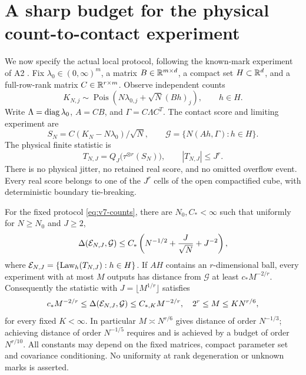 \section{A sharp budget for the physical count-to-contact experiment}
\label{sec:v7-a2}
We now specify the actual local protocol, following the known-mark
experiment of A2 \cite{QiA2v118}. Fix $\lambda_0\in(0,\infty)^m$, a
matrix $B\in\mathbb R^{m\times d}$, a compact set $H\subset\mathbb R^d$, and a
full-row-rank matrix $C\in\mathbb R^{r\times m}$. Observe independent counts
\begin{equation}
 K_{N,j}\sim\operatorname{Pois}
       (N\lambda_{0,j}+\sqrt N(Bh)_j),\qquad h\in H.    \label{eq:v7-counts}
\end{equation}
Write $\Lambda=\operatorname{diag}\lambda_0$, $A=CB$, and $\Gamma=C\Lambda C^T$.
The contact score and limiting experiment are
\[
 S_N=C(K_N-N\lambda_0)/\sqrt N,\qquad
 \mathcal G=\{N(Ah,\Gamma):h\in H\}.
\]
The physical finite statistic is
\begin{equation}
          T_{N,J}=Q_J\bigl(\tau^{\otimes r}(S_N)\bigr),
               \qquad |T_{N,J}|\le J^r.               \label{eq:v7-physical-statistic}
\end{equation}
There is no physical jitter, no retained real score, and no omitted
overflow event. Every real score belongs to one of the $J^r$ cells of
the open compactified cube, with deterministic boundary tie-breaking.

\begin{theorem}
\label{thm:v7-a2}
For the fixed protocol \eqref{eq:v7-counts}, there are $N_0,C_*<\infty$
such that uniformly for $N\ge N_0$ and $J\ge2$,
\begin{equation}
 \Delta(\mathcal E_{N,J},\mathcal G)
 \le C_*\left(N^{-1/2}+\frac{J}{\sqrt N}+J^{-2}\right), 
                                                               \label{eq:v7-a2-bound}
\end{equation}
where $\mathcal E_{N,J}=\{\operatorname{Law}_h(T_{N,J}):h\in H\}$.
If $AH$ contains an $r$-dimensional ball, every experiment with at most
$M$ outputs has distance from $\mathcal G$ at least $c_*M^{-2/r}$.
Consequently the statistic with $J=\lfloor M^{1/r}\rfloor$ satisfies
\begin{equation}
 c_*M^{-2/r}\le\Delta(\mathcal E_{N,J},\mathcal G)
               \le C_{*,K}M^{-2/r},
 \quad 2^r\le M\le K N^{r/6},                          \label{eq:v7-a2-window}
\end{equation}
for every fixed $K<\infty$. In particular $M\asymp N^{r/6}$ gives
distance of order $N^{-1/3}$; achieving distance of order $N^{-1/5}$
requires and is achieved by a budget of order $N^{r/10}$.
All constants may depend on the fixed matrices, compact parameter set
and covariance conditioning. No uniformity at rank degeneration or
unknown marks is asserted.
\end{theorem}

